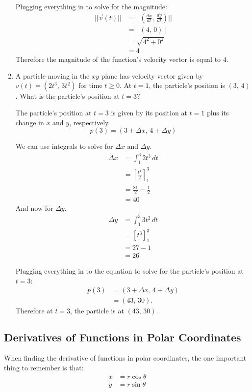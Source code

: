 \documentclass[12pt]{article}
\begin{document}
\begin{enumerate}
	      Plugging everything in to solve for the magnitude:
	      \begin{align*}
		      ||\vec{v}(t)|| & = ||(\frac{dx}{dt}, \, \frac{dy}{dt})|| \\[6pt]
		      & = ||(4, \, 0)||                         \\
		      & = \sqrt{4^2 + 0^2}                      \\
		      & = 4
	      \end{align*}
	      Therefore the magnitude of the function's velocity vector is equal to $4$.
	      \bigskip

	\item A particle moving in the $xy$ plane has velocity vector given by $v(t) = (2t^3, \, 3t^2)$ for time $t \ge 0$. At $t=1$, the particle's position is $(3, \, 4)$. What is the particle's position at $t=3$?

	      The particle's position at $t=3$ is given by its position at $t=1$ plus its change in $x$ and $y$, respectively.
	      \[ p(3) = (3 + \Delta x, \, 4 + \Delta y) \]

	      We can use integrals to solve for $\Delta x$ and $\Delta y$.
	      \begin{align*}
		      \Delta x & = \int_1^3 2t^3 \, dt              \\
		      & = \left[ \frac{t^4}{2} \right]_1^3 \\[6pt]
		      & = \frac{81}{2} - \frac{1}{2}       \\[6pt]
		      & = 40
	      \end{align*}
	      And now for $\Delta y$.
	      \begin{align*}
		      \Delta y & = \int_1^3 3t^2 \, dt    \\
		      & = \left[ t^3 \right]_1^3 \\
		      & = 27 - 1                 \\
		      & = 26
	      \end{align*}

	      Plugging everything in to the equation to solve for the particle's position at $t=3$:
	      \begin{align*}
		      p(3) & = (3 + \Delta x, \, 4 + \Delta y) \\
		      & = (43, \, 30).
	      \end{align*}
	      Therefore at $t=3$, the particle is at $(43, \, 30)$.
\end{enumerate}

\subsection{Derivatives of Functions in Polar Coordinates}
When finding the derivative of functions in polar coordinates, the one important thing to remember is that:
\begin{align*}
	x & = r \cos \theta \\
	y & = r \sin \theta
\end{align*}
\end{document}

